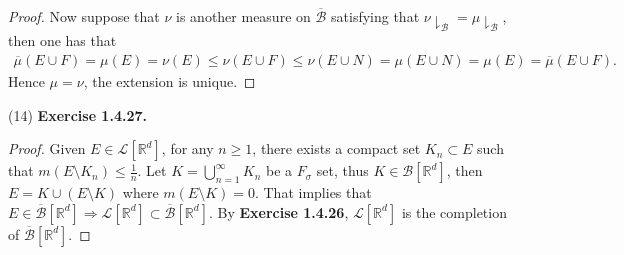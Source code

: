 \documentclass[a4paper]{article}
\begin{document}
\begin{proof}
Now suppose that $\nu$ is another measure on $\overline{\mathcal{B}}$ satisfying that 
$\nu \downharpoonright_\mathcal{B} = \mu \downharpoonright_\mathcal{B}$, then one has that \begin{align*}
\overline{\mu}(E \cup F) = \mu(E) = \nu(E) \leq \nu(E \cup F) \leq \nu(E \cup N) = \mu(E \cup N) = \mu(E) = 
\overline{\mu}(E \cup F).
\end{align*}
Hence $\mu = \nu$, the extension is unique.
\end{proof}

(14) {\bfseries Exercise 1.4.27.} \begin{proof}
Given $E \in \mathcal{L}[\mathbb{R}^d]$, for any $n \geq 1$, there exists a compact set $K_n \subset E$ 
such that $m(E \setminus K_n) \leq \frac{1}{n}$. Let $K = \bigcup_{n = 1}^\infty K_n$ be a $F_\sigma$ set, thus 
$K \in \mathcal{B}[\mathbb{R}^d]$, then $E = K \cup (E \setminus K)$ where $m(E \setminus K) = 0$. That implies that
$E \in \overline{\mathcal{B}}[\mathbb{R}^d] \Rightarrow \mathcal{L}[\mathbb{R}^d] \subset \overline
{\mathcal{B}}[\mathbb{R}^d]$. By {\bfseries Exercise 1.4.26}, $\mathcal{L}[\mathbb{R}^d]$ is the completion of 
$\overline{\mathcal{B}}[\mathbb{R}^d]$.
\end{proof}
\end{document}

